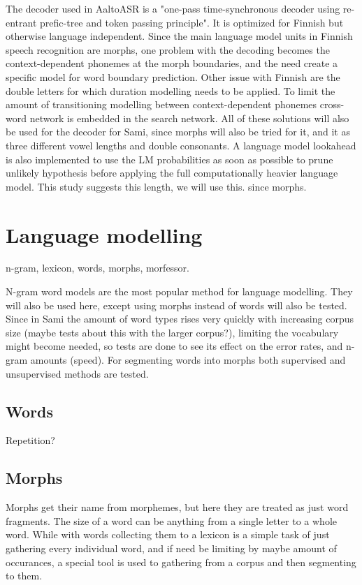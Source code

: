\documentclass[10pt,b5paper]{article}
\begin{document}
The decoder used in AaltoASR is a "one-pass time-synchronous decoder using re-entrant prefic-tree and token passing principle". It is optimized for Finnish but otherwise language independent. Since the main language model units in Finnish speech recognition are morphs, one problem with the decoding becomes the context-dependent phonemes at the morph boundaries, and the need create a specific model for word boundary prediction. Other issue with Finnish are the double letters for which duration modelling needs to be applied. To limit the amount of transitioning modelling between context-dependent phonemes cross-word network is embedded in the search network. All of these solutions will also be used for the decoder for Sami, since morphs will also be tried for it, and it as three different vowel lengths and double consonants. A language model lookahead is also implemented to use the LM probabilities as soon as possible to prune unlikely hypothesis before applying the full computationally heavier language model. This study suggests this length, we will use this. since morphs.

\section{Language modelling}

n-gram, lexicon, words, morphs, morfessor. 

N-gram word models are the most popular method for language modelling. They will also be used here, except using morphs instead of words will also be tested. Since in Sami the amount of word types rises very quickly with increasing corpus size (maybe tests about this with the larger corpus?), limiting the vocabulary might become needed, so tests are done to see its effect on the error rates, and n-gram amounts (speed). For segmenting words into morphs both supervised and unsupervised methods are tested.

\subsection{Words}

Repetition?

\subsection{Morphs}

Morphs get their name from morphemes, but here they are treated as just word fragments. The size of a word can be anything from a single letter to a whole word. While with words collecting them to a lexicon is a simple task of just gathering every individual word, and if need be limiting by maybe amount of occurances, a special tool is used to gathering from a corpus and then segmenting to them.
\end{document}
